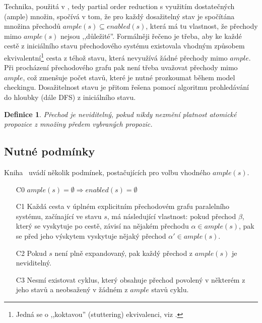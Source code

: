 \documentclass[12pt]{fithesis2}
\newtheorem{definition}{Definice}
\begin{document}
Technika, použitá v \cite{CLARKE}, tedy partial order reduction s využitím dostatečných (ample) množin, spočívá v tom, že pro každý dosažitelný stav je spočítána množina přechodů $\mathit{ample}(s) \subseteq \mathit{enabled}(s)$, která má tu vlastnost, že přechody mimo $\mathit{ample}(s)$ nejsou ,,důležité''. Formálněji řečeno je třeba, aby ke každé cestě z iniciálního stavu přechodového systému existovala vhodným způsobem ekvivalentní\footnote{Jedná se o ,,koktavou'' (stuttering) ekvivalenci, viz \cite{CLARKE}.} cesta z téhož stavu, která nevyužívá žádné přechody mimo $\mathit{ample}$. Při procházení přechodového grafu pak není třeba uvažovat přechody mimo $\mathit{ample}$, což zmenšuje počet stavů, které je nutné prozkoumat během model checkingu. Dosažitelnost stavu je přitom řešena pomocí algoritmu prohledávání do hloubky (dále DFS) z iniciálního stavu.

\begin{definition}
Přechod je neviditelný, pokud nikdy nezmění platnost atomické propozice z množiny předem vybraných propozic.
\end{definition}

\subsection{Nutné podmínky}
\label{subsec:por:ample-conditions}
Kniha~\cite{CLARKE} uvádí několik podmínek, postačujících pro volbu vhodného $\mathit{ample}(s)$.

\begin{enumerate}
\item[C0] $\mathit{ample}(s) = \emptyset \Rightarrow \mathit{enabled}(s) = \emptyset$
\item[C1] Každá cesta v úplném explicitním přechodovém grafu paralelního systému, začínající ve stavu $s$, má následující vlastnost: pokud přechod $\beta$, který se vyskytuje po cestě, závisí na nějakém přechodu $\alpha \in \mathit{ample}(s)$, pak se před jeho výskytem vyskytuje nějaký přechod $\alpha' \in \mathit{ample}(s)$.
\item[C2] Pokud $s$ není plně expandovaný, pak každý přechod z $\mathit{ample}(s)$ je neviditelný.
\item[C3] Nesmí existovat cyklus, který obsahuje přechod povolený v některém z jeho stavů a neobsažený v žádném z $\mathit{ample}$ stavů cyklu.
\end{enumerate}
\end{document}
